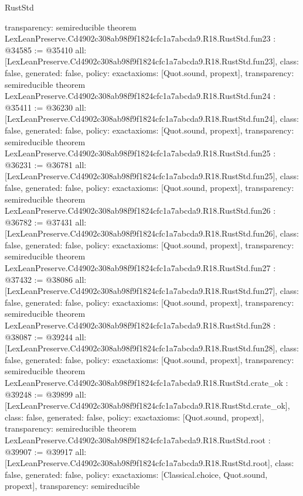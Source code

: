 \begin{lexlean}{RustStd}
\begin{coremodule}
{  transparency: semireducible
}
theorem LexLeanPreserve.Cd4902c308ab98f9f1824cfc1a7abcda9.R18.RustStd.fun23 : @34585 := @35410 {
  all: [LexLeanPreserve.Cd4902c308ab98f9f1824cfc1a7abcda9.R18.RustStd.fun23],
  class: false,
  generated: false,
  policy: exact{axioms: [Quot.sound, propext]},
  transparency: semireducible
}
theorem LexLeanPreserve.Cd4902c308ab98f9f1824cfc1a7abcda9.R18.RustStd.fun24 : @35411 := @36230 {
  all: [LexLeanPreserve.Cd4902c308ab98f9f1824cfc1a7abcda9.R18.RustStd.fun24],
  class: false,
  generated: false,
  policy: exact{axioms: [Quot.sound, propext]},
  transparency: semireducible
}
theorem LexLeanPreserve.Cd4902c308ab98f9f1824cfc1a7abcda9.R18.RustStd.fun25 : @36231 := @36781 {
  all: [LexLeanPreserve.Cd4902c308ab98f9f1824cfc1a7abcda9.R18.RustStd.fun25],
  class: false,
  generated: false,
  policy: exact{axioms: [Quot.sound, propext]},
  transparency: semireducible
}
theorem LexLeanPreserve.Cd4902c308ab98f9f1824cfc1a7abcda9.R18.RustStd.fun26 : @36782 := @37431 {
  all: [LexLeanPreserve.Cd4902c308ab98f9f1824cfc1a7abcda9.R18.RustStd.fun26],
  class: false,
  generated: false,
  policy: exact{axioms: [Quot.sound, propext]},
  transparency: semireducible
}
theorem LexLeanPreserve.Cd4902c308ab98f9f1824cfc1a7abcda9.R18.RustStd.fun27 : @37432 := @38086 {
  all: [LexLeanPreserve.Cd4902c308ab98f9f1824cfc1a7abcda9.R18.RustStd.fun27],
  class: false,
  generated: false,
  policy: exact{axioms: [Quot.sound, propext]},
  transparency: semireducible
}
theorem LexLeanPreserve.Cd4902c308ab98f9f1824cfc1a7abcda9.R18.RustStd.fun28 : @38087 := @39244 {
  all: [LexLeanPreserve.Cd4902c308ab98f9f1824cfc1a7abcda9.R18.RustStd.fun28],
  class: false,
  generated: false,
  policy: exact{axioms: [Quot.sound, propext]},
  transparency: semireducible
}
theorem LexLeanPreserve.Cd4902c308ab98f9f1824cfc1a7abcda9.R18.RustStd.crate_ok : @39248 := @39899 {
  all: [LexLeanPreserve.Cd4902c308ab98f9f1824cfc1a7abcda9.R18.RustStd.crate_ok],
  class: false,
  generated: false,
  policy: exact{axioms: [Quot.sound, propext]},
  transparency: semireducible
}
theorem LexLeanPreserve.Cd4902c308ab98f9f1824cfc1a7abcda9.R18.RustStd.root : @39907 := @39917 {
  all: [LexLeanPreserve.Cd4902c308ab98f9f1824cfc1a7abcda9.R18.RustStd.root],
  class: false,
  generated: false,
  policy: exact{axioms: [Classical.choice, Quot.sound, propext]},
  transparency: semireducible
}


\end{coremodule}
\end{lexlean}

